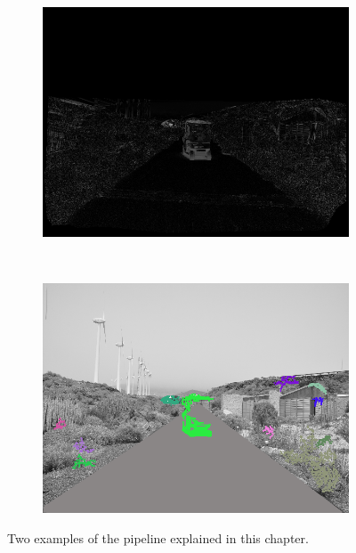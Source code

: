 \begin{figure}[h!]
\begin{subfigure}[b]{0.24\columnwidth}
	    \includegraphics[width=\textwidth]{pipeline2/fig4}\label{fig:pipelineB_3}
        \end{subfigure}%
        ~
        \begin{subfigure}[b]{0.24\columnwidth}
	    \includegraphics[width=\textwidth]{pipeline2/fig5}\label{fig:pipelineB_4}
        \end{subfigure}%
        \caption{Two examples of the pipeline explained in this chapter.}\label{fig:cp02_pipeline_example}
\end{figure}

